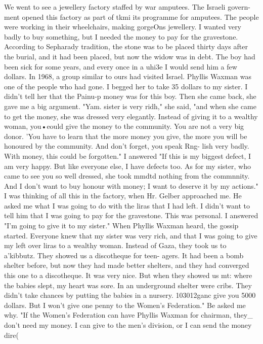 We went to see a jewellery factory staffed by war amputees. The Israeli govern-ment 
opened this factory as part of tkmi its programme for amputees. The people 
were working in their wheelchairs, making gorgeOns jewellery. I wanted very badly to 
buy something, but I needed the money to pay for the gravestone. 
According to Sepharady tradition, the stone was to be placed thirty days after the 
burial, and it had been placed, but now the widow was in debt. The boy had been sick 
for some years, and every once in a uhi3e I would send him a few dollars. In 1968, 
a group similar to ours had visited Israel. Phyllis Waxman was one of the people who 
had gone. I begged her to take 35 dollars to my sister. I didn't tell her that the 
Painu-p 
money was for this boy. Then she came back, she gave me a big argument. "Yam. sister 
is very ridh," she said, "and when she came to get the money, she was dressed very 
elegantly. Instead of giving it to a wealthy woman, you•eould give the money to the 
community. You are not a very big donor. 'You have to learn that the more money you 
give, the more you will be honoured by the community. And don't forget, you speak Rng-
lish very badly. With money, this could be forgotten." 
I answered "If this is my biggest defect, I am very happy. But like everyone else, 
I have defects too. As for my sister, who came to see you so well dressed, she took mmdtd 
nothing from the commnnity. And I don't want to buy honour with money; I want to deserve 
it by my actions." 
I was thinking of all this in the factory, when Hr. Gelber approached me. He asked 
me what I was going to do with the liras that I had left. I didn't want to tell him 
that I was going to pay for the gravestone. This was personal. I answered "I'm going to 
give it to my sister." When Phyllis Waxman heard, the gossip started. Everyone knew 
that my sister was very rich, and that I was going to give my left over liras to a 
wealthy woman. 
Instead of Gaza, they took us to a'kibbutz. They showed us a discotheque for teen-
agers. It had been a bomb shelter before, but now they had made better shelters, and 
they had converged this one to a discotheque. It was very nice. But when they showed 
us mt: where the babies slept, my heart was sore. In an underground shelter were cribs. 
They didn't take chances by putting the babies in a nursery. 
103012ganc 
give you 5000 dollars. But I won't give one penny to the Women's Federation." Be 
asked me why. "If the Women's Federation can have Phyllis Waxman for chairman, they_ 
don't need my money. I can give to the men's division, or I can send the money dire( 
